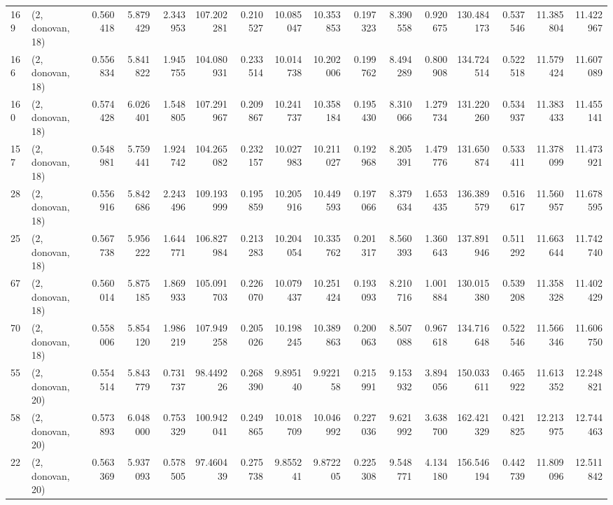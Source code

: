 \begin{tabular}{llrrrrrrrrrrrrrr}
169 &  (2, donovan, 18) &   0.560418 &   5.879429 &  2.343953 &  107.202281 &  0.210527 &  10.085047 &  10.353853 &  0.197323 &   8.390558 &   0.920675 &  130.484173 &  0.537546 &  11.385804 &  11.422967 \\
166 &  (2, donovan, 18) &   0.556834 &   5.841822 &  1.945755 &  104.080931 &  0.233514 &  10.014738 &  10.202006 &  0.199762 &   8.494289 &   0.800908 &  134.724514 &  0.522518 &  11.579424 &  11.607089 \\
160 &  (2, donovan, 18) &   0.574428 &   6.026401 &  1.548805 &  107.291967 &  0.209867 &  10.241737 &  10.358184 &  0.195430 &   8.310066 &   1.279734 &  131.220260 &  0.534937 &  11.383433 &  11.455141 \\
157 &  (2, donovan, 18) &   0.548981 &   5.759441 &  1.924742 &  104.265082 &  0.232157 &  10.027983 &  10.211027 &  0.192968 &   8.205391 &   1.479776 &  131.650874 &  0.533411 &  11.378099 &  11.473921 \\
28  &  (2, donovan, 18) &   0.556916 &   5.842686 &  2.243496 &  109.193999 &  0.195859 &  10.205916 &  10.449593 &  0.197066 &   8.379634 &   1.653435 &  136.389579 &  0.516617 &  11.560957 &  11.678595 \\
25  &  (2, donovan, 18) &   0.567738 &   5.956222 &  1.644771 &  106.827984 &  0.213283 &  10.204054 &  10.335762 &  0.201317 &   8.560393 &   1.360643 &  137.891946 &  0.511292 &  11.663644 &  11.742740 \\
67  &  (2, donovan, 18) &   0.560014 &   5.875185 &  1.869933 &  105.091703 &  0.226070 &  10.079437 &  10.251424 &  0.193093 &   8.210716 &   1.001884 &  130.015380 &  0.539208 &  11.358328 &  11.402429 \\
70  &  (2, donovan, 18) &   0.558006 &   5.854120 &  1.986219 &  107.949258 &  0.205026 &  10.198245 &  10.389863 &  0.200063 &   8.507088 &   0.967618 &  134.716648 &  0.522546 &  11.566346 &  11.606750 \\
55  &  (2, donovan, 20) &   0.554514 &   5.843779 &  0.731737 &   98.449226 &  0.268390 &   9.895140 &   9.922158 &  0.215991 &   9.153932 &   3.894056 &  150.033611 &  0.465922 &  11.613352 &  12.248821 \\
58  &  (2, donovan, 20) &   0.573893 &   6.048000 &  0.753329 &  100.942041 &  0.249865 &  10.018709 &  10.046992 &  0.227036 &   9.621992 &   3.638700 &  162.421329 &  0.421825 &  12.213975 &  12.744463 \\
22  &  (2, donovan, 20) &   0.563369 &   5.937093 &  0.578505 &   97.460439 &  0.275738 &   9.855241 &   9.872205 &  0.225308 &   9.548771 &   4.134180 &  156.546194 &  0.442739 &  11.809096 &  12.511842 \\

\end{tabular}
